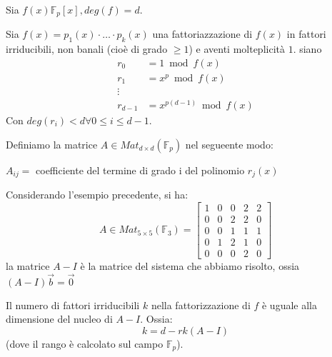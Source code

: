 \documentclass[../main.tex]{subfiles}
\begin{document}
Sia $f(x) \mathbb{F}_p[x], deg(f) = d$.

Sia $f(x) = p_1(x)\cdot \ldots \cdot p_k(x)$ una fattoriazzazione di $f(x)$ in fattori irriducibili, non banali (cioè di grado $\geq 1$) e aventi molteplicità $1$. siano
\begin{align*}
    r_0       & = 1 \bmod f(x)            \\
    r_1       & = x^p \bmod f(x)          \\
    \vdots    &                           \\
    r_{d - 1} & = x^{p(d - 1)} \bmod f(x)
\end{align*}
Con $deg(r_i) < d \forall 0 \leq i \leq d - 1$.

Definiamo la matrice $A \in Mat_{d \times d}(\mathbb{F}_p)$ nel segueente modo:

$A_{ij} = $ coefficiente del termine di grado i del polinomio $r_j(x)$
\begin{example}
    Considerando l'esempio precedente, si ha:
    \begin{equation*}
        A \in Mat_{5 \times 5}(\mathbb{F}_3) =
        \begin{bmatrix}
            1 & 0 & 0 & 2 & 2 \\
            0 & 0 & 2 & 2 & 0 \\
            0 & 0 & 1 & 1 & 1 \\
            0 & 1 & 2 & 1 & 0 \\
            0 & 0 & 0 & 2 & 0
        \end{bmatrix}
    \end{equation*}
    la matrice $A - I$ è la matrice del sistema che abbiamo risolto, ossia $(A - I)\overrightarrow{b} = \overrightarrow{0}$
\end{example}

\begin{theorem}
    Il numero di fattori irriducibili $k$ nella fattorizzazione di $f$ è uguale alla dimensione del nucleo di $A - I$. Ossia:
    \begin{equation*}
        k = d - rk(A - I)
    \end{equation*}
    (dove il rango è calcolato sul campo $\mathbb{F}_p$).
\end{theorem}
\end{document}
